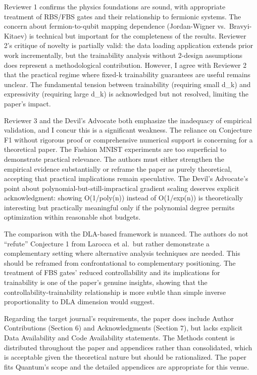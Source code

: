 \documentclass[10pt,letterpaper]{article}
\begin{document}
Reviewer 1 confirms the physics foundations are sound, with appropriate treatment of RBS/FBS gates and their relationship to fermionic systems. The concern about fermion-to-qubit mapping dependence (Jordan-Wigner vs.~Bravyi-Kitaev) is technical but important for the completeness of the results. Reviewer 2's critique of novelty is partially valid: the data loading application extends prior work incrementally, but the trainability analysis without 2-design assumptions does represent a methodological contribution. However, I agree with Reviewer 2 that the practical regime where fixed-k trainability guarantees are useful remains unclear. The fundamental tension between trainability (requiring small d\_k) and expressivity (requiring large d\_k) is acknowledged but not resolved, limiting the paper's impact.

Reviewer 3 and the Devil's Advocate both emphasize the inadequacy of empirical validation, and I concur this is a significant weakness. The reliance on Conjecture F1 without rigorous proof or comprehensive numerical support is concerning for a theoretical paper. The Fashion MNIST experiments are too superficial to demonstrate practical relevance. The authors must either strengthen the empirical evidence substantially or reframe the paper as purely theoretical, accepting that practical implications remain speculative. The Devil's Advocate's point about polynomial-but-still-impractical gradient scaling deserves explicit acknowledgment: showing O(1/poly(n)) instead of O(1/exp(n)) is theoretically interesting but practically meaningful only if the polynomial degree permits optimization within reasonable shot budgets.

The comparison with the DLA-based framework is nuanced. The authors do not ``refute'' Conjecture 1 from Larocca et al.~but rather demonstrate a complementary setting where alternative analysis techniques are needed. This should be reframed from confrontational to complementary positioning. The treatment of FBS gates' reduced controllability and its implications for trainability is one of the paper's genuine insights, showing that the controllability-trainability relationship is more subtle than simple inverse proportionality to DLA dimension would suggest.

Regarding the target journal's requirements, the paper does include Author Contributions (Section 6) and Acknowledgments (Section 7), but lacks explicit Data Availability and Code Availability statements. The Methods content is distributed throughout the paper and appendices rather than consolidated, which is acceptable given the theoretical nature but should be rationalized. The paper fits Quantum's scope and the detailed appendices are appropriate for this venue.
\end{document}
